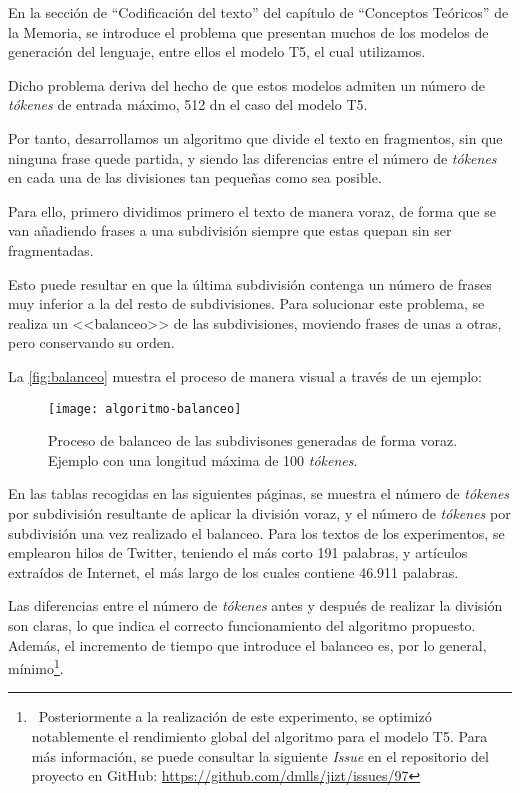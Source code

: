 
En la sección de ``Codificación del texto'' del capítulo de ``Conceptos Teóricos'' de la Memoria, se introduce el problema que presentan muchos de los modelos de generación del lenguaje, entre ellos el modelo T5, el cual utilizamos. 

Dicho problema deriva del hecho de que estos modelos admiten un número de \emph{tókenes} de entrada máximo, 512 dn el caso del modelo T5.

Por tanto, desarrollamos un algoritmo que divide el texto en fragmentos, sin que ninguna frase quede partida, y siendo las diferencias entre el número de \emph{tókenes} en cada una de las divisiones tan pequeñas como sea posible.

Para ello, primero dividimos primero el texto de manera voraz, de forma que se van añadiendo frases a una subdivisión siempre que estas quepan sin ser fragmentadas. 

Esto puede resultar en que la última subdivisión contenga un número de frases muy inferior a la del resto de subdivisiones. Para solucionar este problema, se realiza un <<balanceo>> de las subdivisiones, moviendo frases de unas a otras, pero conservando su orden.

La \autoref{fig:balanceo} muestra el proceso de manera visual a través de un ejemplo:

\newpage

\begin{figure}[h!]
	\centering
	\texttt{[image: algoritmo-balanceo]}
	\vspace{-0.5cm}
	\caption{Proceso de balanceo de las subdivisones generadas de forma voraz. Ejemplo con una longitud máxima de 100 \emph{tókenes}.}
	\label{fig:balanceo}
\end{figure}

En las tablas recogidas en las siguientes páginas, se muestra el número de \emph{tókenes} por subdivisión resultante de aplicar la división voraz, y el número de \emph{tókenes} por subdivisión una vez realizado el balanceo. Para los textos de los experimentos, se emplearon hilos de Twitter, teniendo el más corto 191 palabras, y artículos extraídos de Internet, el más largo de los cuales contiene 46.911 palabras.

Las diferencias entre el número de \emph{tókenes} antes y después de realizar la división  son claras, lo que indica el correcto funcionamiento del algoritmo propuesto. Además, el incremento de tiempo que introduce el balanceo es, por lo general, mínimo\footnote{\, Posteriormente a la realización de este experimento, se optimizó notablemente el rendimiento global del algoritmo para el modelo T5. Para más información, se puede consultar la siguiente \emph{Issue} en el repositorio del proyecto en GitHub: \href{https://github.com/dmlls/jizt/issues/97}{https://github.com/dmlls/jizt/issues/97}}.

